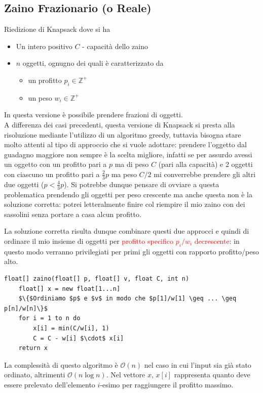 \documentclass[../cheatSheetAlgoritmi.tex]{subfiles}
\begin{document}
\subsection{Zaino Frazionario (o Reale)}
Riedizione di Knapsack dove si ha
\begin{itemize}
	\item Un intero positivo $C$ - capacità dello zaino
	\item $n$ oggetti, ognugno dei quali è caratterizzato da
	\begin{itemize}
		\item un profitto $p_{i} \in \mathbb{Z}^{+}$
		\item un peso $w_{i} \in \mathbb{Z}^{+}$
	\end{itemize}
\end{itemize}
In questa versione è possibile prendere frazioni di oggetti.\\
A differenza dei casi precedenti, questa versione di Knapsack si presta alla risoluzione mediante l'utilizzo di un algoritmo greedy, tuttavia bisogna stare molto attenti al tipo di approccio che si vuole adottare: prendere l'oggetto dal guadagno maggiore non sempre è la scelta migliore, infatti se per assurdo avessi un oggetto con un profitto pari a $p$ ma di peso $C$ (pari alla capacità) e 2 oggetti con ciascuno un profitto pari a $\frac{2}{3} p$ ma peso $C/2$ mi converrebbe prendere gli altri due oggetti ($p < \frac{4}{3}p$). Si potrebbe dunque pensare di ovviare a questa problematica prendendo gli oggetti per peso crescente ma anche questa non è la soluzione corretta: potrei letteralmente finire col riempire il mio zaino con dei sassolini senza portare a casa alcun profitto.

La soluzione corretta risulta dunque combinare questi due approcci e quindi di ordinare il mio insieme di oggetti per \textcolor{red}{profitto specifico $p_{i}/w_{i}$ decrescente}: in questo modo verranno privilegiati per primi gli oggetti con rapporto profitto/peso alto.
\begin{lstlisting}[caption=Zaino Frazionario]
float[] zaino(float[] p, float[] v, float C, int n)
	float[] x = new float[1...n]
	$\{$Ordiniamo $p$ e $v$ in modo che $p[1]/w[1] \geq ... \geq p[n]/w[n]\}$
	for i = 1 to n do
		x[i] = min(C/w[i], 1)
		C = C - w[i] $\cdot$ x[i]
	return x
\end{lstlisting}
La complessità di questo algoritmo è $\mathcal{O}(n)$ nel caso in cui l'input sia già stato ordinato, altrimenti $\mathcal{O}(n \log{n})$. Nel vettore $x$, $x[i]$ rappresenta quanto deve essere prelevato dell'elemento $i$-esimo per raggiungere il profitto massimo.
\end{document}
